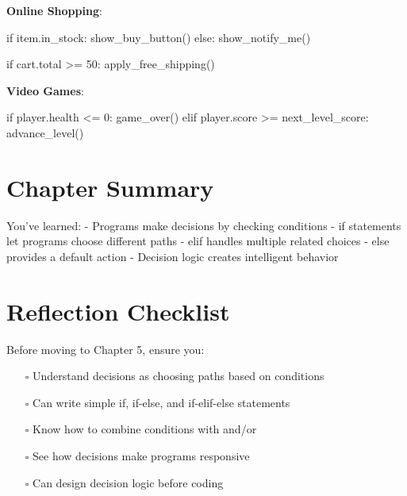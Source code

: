 \documentclass[
  letterpaper,
  DIV=11,
  numbers=noendperiod,
  oneside]{scrreprt}
\newenvironment{Shaded}{}{}
\newcommand{\ControlFlowTok}[1]{\textcolor[rgb]{0.84,0.23,0.29}{#1}}
\newcommand{\DecValTok}[1]{\textcolor[rgb]{0.00,0.36,0.77}{#1}}
\newcommand{\NormalTok}[1]{\textcolor[rgb]{0.14,0.16,0.18}{#1}}
\newcommand{\OperatorTok}[1]{\textcolor[rgb]{0.14,0.16,0.18}{#1}}
\providecommand{\tightlist}{%
  \setlength{\itemsep}{0pt}\setlength{\parskip}{0pt}}\usepackage{longtable,booktabs,array}
\begin{document}
\textbf{Online Shopping}:

\begin{Shaded}
\begin{Highlighting}[]
\ControlFlowTok{if}\NormalTok{ item.in\_stock:}
\NormalTok{    show\_buy\_button()}
\ControlFlowTok{else}\NormalTok{:}
\NormalTok{    show\_notify\_me()}
    
\ControlFlowTok{if}\NormalTok{ cart.total }\OperatorTok{\textgreater{}=} \DecValTok{50}\NormalTok{:}
\NormalTok{    apply\_free\_shipping()}
\end{Highlighting}
\end{Shaded}

\textbf{Video Games}:

\begin{Shaded}
\begin{Highlighting}[]
\ControlFlowTok{if}\NormalTok{ player.health }\OperatorTok{\textless{}=} \DecValTok{0}\NormalTok{:}
\NormalTok{    game\_over()}
\ControlFlowTok{elif}\NormalTok{ player.score }\OperatorTok{\textgreater{}=}\NormalTok{ next\_level\_score:}
\NormalTok{    advance\_level()}
\end{Highlighting}
\end{Shaded}

\section{Chapter Summary}\label{chapter-summary-4}

You've learned: - Programs make decisions by checking conditions - if
statements let programs choose different paths - elif handles multiple
related choices - else provides a default action - Decision logic
creates intelligent behavior

\section{Reflection Checklist}\label{reflection-checklist-3}

Before moving to Chapter 5, ensure you:

\begin{itemize}
\tightlist
\item[$\square$]
  Understand decisions as choosing paths based on conditions
\item[$\square$]
  Can write simple if, if-else, and if-elif-else statements
\item[$\square$]
  Know how to combine conditions with and/or
\item[$\square$]
  See how decisions make programs responsive
\item[$\square$]
  Can design decision logic before coding
\end{itemize}
\end{document}
